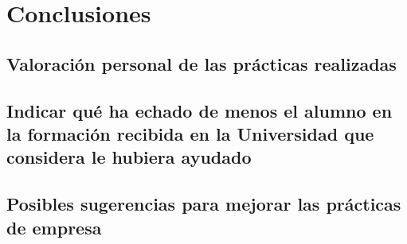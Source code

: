 \section{Conclusiones}
\subsection{Valoración personal de las prácticas realizadas}


\subsection{Indicar qué ha echado de menos el alumno en la formación recibida en la Universidad que considera le hubiera ayudado}


\subsection{Posibles sugerencias para mejorar las prácticas de empresa}


\newpage